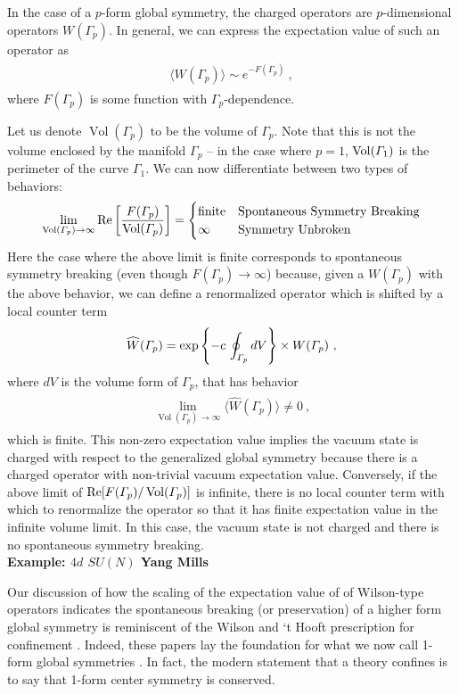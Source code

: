 \documentclass[11pt]{article}
\newcommand{\eq}[1]{\begin{align}\begin{split}#1\end{split}\end{align}}
\def\exp{{\rm exp}}
\renewcommand{\Re}{{\rm Re }}
\begin{document}
In the case of a $p$-form global symmetry, the charged operators are $p$-dimensional operators $W(\Gamma_p)$. In general, we can express the expectation value of such an operator as 
\eq{
\big\langle W(\Gamma_p)\big\rangle\sim e^{-F(\Gamma_p)}~,
}
where $F(\Gamma_p)$ is some function with $\Gamma_p$-dependence. 

Let us denote $\operatorname{Vol}(\Gamma_p)$ to be the volume of $\Gamma_p$. Note that this is not the volume enclosed by the manifold $\Gamma_p$ -- in the case where $p=1$, ${\rm Vol}(\Gamma_1)$ is the perimeter of the curve $\Gamma_1$. 
We can now differentiate between two types of behaviors:
\eq{
\lim_{\operatorname{Vol}(\Gamma_p)\to \infty}\Re\left[\frac{F(\Gamma_p)}{\operatorname{Vol}(\Gamma_p)}\right]=\begin{cases}
{\rm finite}& \text{Spontaneous Symmetry Breaking}\\
\infty& \text{Symmetry Unbroken}
\end{cases}
}
Here the case where the above limit is finite corresponds to spontaneous symmetry breaking (even though $F(\Gamma_p) \to \infty$) because, given a $W(\Gamma_p)$ with the above behavior, we can define a renormalized operator which is  shifted by a local counter term 
\eq{
\widehat{W}(\Gamma_p)=\exp\left\{-c \,\oint_{\Gamma_p}dV\right\}\times W(\Gamma_p)~, }
where $dV$ is the volume form of $\Gamma_p$, that has behavior 
\eq{
\lim_{\operatorname{Vol}(\Gamma_p)\to \infty}\big\langle \widehat{W}(\Gamma_p)\big\rangle\neq 0~,
}
which is finite. This non-zero expectation value implies the vacuum state is charged with respect to the generalized global symmetry because there is a charged operator with non-trivial vacuum expectation value. Conversely, if the above limit of $\Re[F(\Gamma_p)/\operatorname{Vol}(\Gamma_p)]$ is infinite, there is no local counter term with which to renormalize the operator so that it has finite expectation value in the infinite volume limit. In this case, the vacuum state is not charged and there is no spontaneous symmetry breaking. \\

\noindent \textbf{Example: $4d$ $SU(N)$ Yang Mills}

Our discussion of how the scaling of the expectation value of of Wilson-type operators indicates the spontaneous breaking (or preservation) of a higher form global symmetry is reminiscent of the Wilson and `t Hooft prescription for confinement \cite{Wilson:1974sk,tHooft:1977nqb,tHooft:1978pzo}. Indeed, these papers lay the foundation for what we now call 1-form global symmetries \cite{tHooft:1977nqb,tHooft:1978pzo}. In fact, the modern statement that a theory confines is to say that 1-form center symmetry is conserved. 
\end{document}
